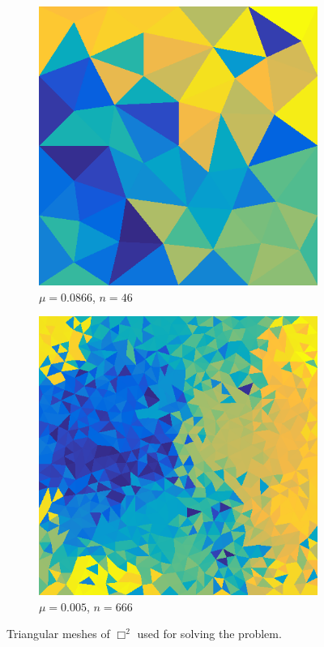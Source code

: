\documentclass[../fem.tex]{subfile}
\begin{document}
\begin{figure}[htpb]
\begin{subfigure}{0.4\textwidth}
    \centering
    \includegraphics[width=0.8\linewidth]{figures/r3/tri.png}
    \caption{$\mu=0.0866$, $n=46$}
  \end{subfigure}
  \begin{subfigure}{0.4\textwidth}
    \centering
    \includegraphics[width=0.8\linewidth]{figures/r4/tri.png}
    \caption{$\mu=0.005$, $n=666$}
  \end{subfigure}
  \caption{Triangular meshes of $\Box^2$ used for solving the problem.}
  \label{fig:b2_mesh}
\end{figure}
\end{document}
